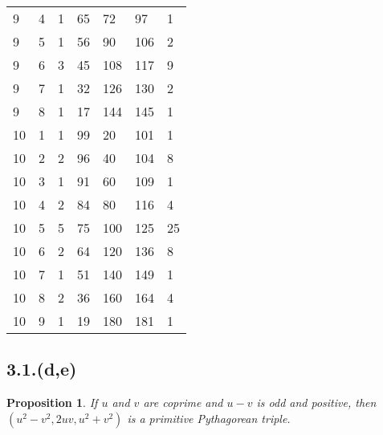 \documentclass[letterpaper, 12pt, oneside]{memoir}
\theoremstyle{mystyle}
\newtheorem*{prop}{Proposition}
\begin{document}
\begin{table}[h!]
\begin{tabular}{|l l l|l l l l|}
    9 & 4 & 1 & 65 & 72 & 97 & 1 \\
    9 & 5 & 1 & 56 & 90 & 106 & 2 \\
    9 & 6 & 3 & 45 & 108 & 117 & 9 \\
    9 & 7 & 1 & 32 & 126 & 130 & 2 \\
    9 & 8 & 1 & 17 & 144 & 145 & 1 \\
    10 & 1 & 1 & 99 & 20 & 101 & 1 \\
    10 & 2 & 2 & 96 & 40 & 104 & 8 \\
    10 & 3 & 1 & 91 & 60 & 109 & 1 \\
    10 & 4 & 2 & 84 & 80 & 116 & 4 \\
    10 & 5 & 5 & 75 & 100 & 125 & 25 \\
    10 & 6 & 2 & 64 & 120 & 136 & 8 \\
    10 & 7 & 1 & 51 & 140 & 149 & 1 \\
    10 & 8 & 2 & 36 & 160 & 164 & 4 \\
    10 & 9 & 1 & 19 & 180 & 181 & 1 \\
    \hline
\end{tabular}
\end{table}


\subsection*{3.1.(d,e)}
\begin{prop}
    If $u$ and $v$ are coprime and $u-v$ is odd and positive, then $(u^2-v^2,
    2uv, u^2+v^2)$ is a primitive Pythagorean triple.
\end{prop}
\end{document}
